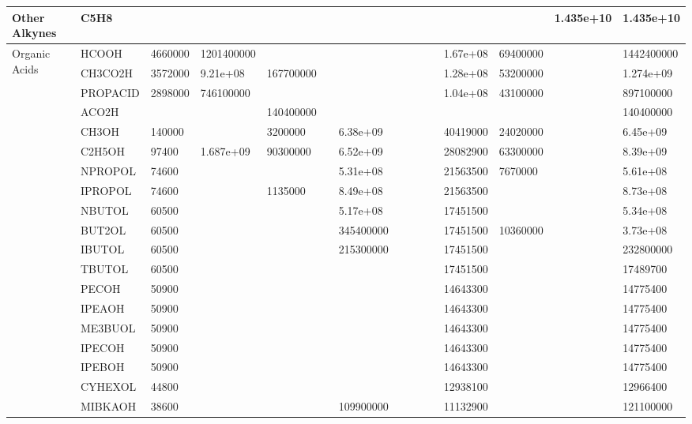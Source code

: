 \begin{longtable}{lllllllllllllll}
	Other Alkynes & C5H8 &  &  &  &  &  &  &  &  &  &  &  & 1.435e+10 & 1.435e+10 \\
	\hline \multirow{4}{*}{Organic Acids} & HCOOH & 4660000 & 1201400000 &  &  &  &  &  &  &  & 1.67e+08 & 69400000 &  & 1442400000 \\
	 & CH3CO2H & 3572000 & 9.21e+08 & 167700000 &  &  &  &  &  &  & 1.28e+08 & 53200000 &  & 1.274e+09 \\
	 & PROPACID & 2898000 & 746100000 &  &  &  &  &  &  &  & 1.04e+08 & 43100000 &  & 897100000 \\
	 & ACO2H &  &  & 140400000 &  &  &  &  &  &  &  &  &  & 140400000 \\
	\hline \parbox[t]{2mm}{} & CH3OH & 140000 &  & 3200000 &  & 6.38e+09 &  &  &  &  & 40419000 & 24020000 &  & 6.45e+09 \\*
	 & C2H5OH & 97400 & 1.687e+09 & 90300000 &  & 6.52e+09 &  &  &  &  & 28082900 & 63300000 &  & 8.39e+09 \\*
	 & NPROPOL & 74600 &  &  &  & 5.31e+08 &  &  &  &  & 21563500 & 7670000 &  & 5.61e+08 \\*
	 & IPROPOL & 74600 &  & 1135000 &  & 8.49e+08 &  &  &  &  & 21563500 &  &  & 8.73e+08 \\*
	 & NBUTOL & 60500 &  &  &  & 5.17e+08 &  &  &  &  & 17451500 &  &  & 5.34e+08 \\
	 & BUT2OL & 60500 &  &  &  & 345400000 &  &  &  &  & 17451500 & 10360000 &  & 3.73e+08 \\
	 & IBUTOL & 60500 &  &  &  & 215300000 &  &  &  &  & 17451500 &  &  & 232800000 \\
	 & TBUTOL & 60500 &  &  &  &  &  &  &  &  & 17451500 &  &  & 17489700 \\
	 & PECOH & 50900 &  &  &  &  &  &  &  &  & 14643300 &  &  & 14775400 \\
	 & IPEAOH & 50900 &  &  &  &  &  &  &  &  & 14643300 &  &  & 14775400 \\
	 & ME3BUOL & 50900 &  &  &  &  &  &  &  &  & 14643300 &  &  & 14775400 \\
	 & IPECOH & 50900 &  &  &  &  &  &  &  &  & 14643300 &  &  & 14775400 \\
	 & IPEBOH & 50900 &  &  &  &  &  &  &  &  & 14643300 &  &  & 14775400 \\
	 & CYHEXOL & 44800 &  &  &  &  &  &  &  &  & 12938100 &  &  & 12966400 \\
	 & MIBKAOH & 38600 &  &  &  & 109900000 &  &  &  &  & 11132900 &  &  & 121100000 \\

\end{longtable}
